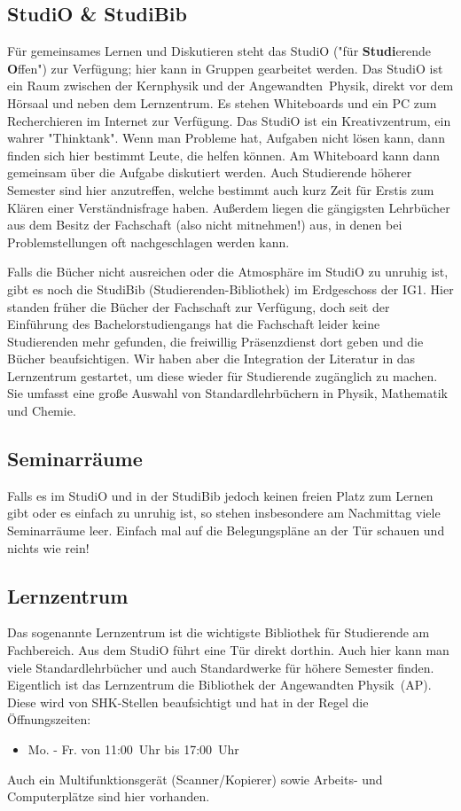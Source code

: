 \begin{multicols*}{2}
\subsection{StudiO \& StudiBib}
Für gemeinsames Lernen und Diskutieren steht das StudiO ("für \textbf{Studi}erende \textbf{O}ffen") zur Verfügung; hier kann in Gruppen gearbeitet werden.
Das StudiO ist ein Raum zwischen der Kernphysik und der Angewandten~Physik, direkt vor dem Hörsaal und neben dem Lernzentrum.
Es stehen Whiteboards und ein PC zum Recherchieren im Internet zur Verfügung.
Das StudiO ist ein Kreativzentrum, ein wahrer "Thinktank".
Wenn man Probleme hat, Aufgaben nicht lösen kann, dann finden sich hier bestimmt Leute, die helfen können.
Am Whiteboard kann dann gemeinsam über die Aufgabe diskutiert werden.
Auch Studierende höherer Semester sind hier anzutreffen, welche bestimmt auch kurz Zeit für Erstis zum Klären einer Verständnisfrage haben.
Außerdem liegen die gängigsten Lehrbücher aus dem Besitz der Fachschaft (also nicht mitnehmen!) aus, in denen bei Problemstellungen oft nachgeschlagen werden kann.

Falls die Bücher nicht ausreichen oder die Atmosphäre im StudiO zu unruhig ist, gibt es noch die StudiBib (Studierenden-Bibliothek) im Erdgeschoss der IG1.
Hier standen früher die Bücher der Fachschaft zur Verfügung, doch seit der Einführung des Bachelorstudiengangs hat die Fachschaft leider keine Studierenden mehr gefunden, die freiwillig Präsenzdienst dort geben und die Bücher beaufsichtigen.
Wir haben aber die Integration der Literatur in das Lernzentrum gestartet, um diese wieder für Studierende zugänglich zu machen.
Sie umfasst eine große Auswahl von Standardlehrbüchern in Physik, Mathematik und Chemie.

\subsection{Seminarräume}
Falls es im StudiO und in der StudiBib jedoch keinen freien Platz zum Lernen gibt oder es einfach zu unruhig ist, so stehen insbesondere am Nachmittag viele Seminarräume leer.
Einfach mal auf die Belegungspläne an der Tür schauen und nichts wie rein!

\subsection{Lernzentrum}
Das sogenannte Lernzentrum ist die wichtigste Bibliothek für Studierende am Fachbereich.
Aus dem StudiO führt eine Tür direkt dorthin.
Auch hier kann man viele Standardlehrbücher und auch Standardwerke für höhere Semester finden.
Eigentlich ist das Lernzentrum die Bibliothek der Angewandten Physik~(AP).
Diese wird von SHK-Stellen beaufsichtigt und hat in der Regel die Öffnungszeiten:
\begin{itemize}
	\item Mo. - Fr. von 11:00~Uhr bis 17:00~Uhr 
\end{itemize}
Auch ein Multifunktionsgerät (Scanner/Kopierer) sowie Arbeits- und Computerplätze sind hier vorhanden.


\end{multicols*}
